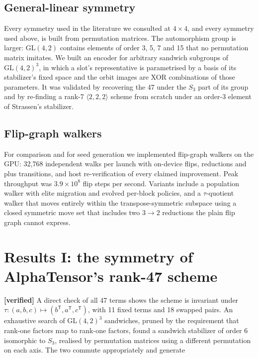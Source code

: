 \documentclass[11pt]{article}
\newcommand{\tw}[3]{\langle #1,#2,#3\rangle}
\newcommand{\GL}{\mathrm{GL}}
\begin{document}
\subsection{General-linear symmetry}

Every symmetry used in the literature we consulted at $4\times4$, and every symmetry used above, is built
from permutation matrices. The automorphism group is larger: $\GL(4,2)$ contains elements of order 3, 5,
7 and 15 that no permutation matrix imitates. We built an encoder for arbitrary sandwich subgroups of
$\GL(4,2)^3$, in which a slot's representative is parametrised by a basis of its stabilizer's fixed space
and the orbit images are XOR combinations of those parameters. It was validated by recovering the 47
under the $S_3$ part of its group and by re-finding a rank-7 $\tw222$ scheme from scratch under an
order-3 element of Strassen's stabilizer.

\subsection{Flip-graph walkers}

For comparison and for seed generation we implemented flip-graph walkers on the GPU: 32{,}768 independent
walks per launch with on-device flips, reductions and plus transitions, and host re-verification of every
claimed improvement. Peak throughput was $3.9\times10^{8}$ flip steps per second. Variants include a
population walker with elite migration and evolved per-block policies, and a $\tau$-quotient walker that
moves entirely within the transpose-symmetric subspace using a closed symmetric move set that includes
two $3\to2$ reductions the plain flip graph cannot express.

\section{Results I: the symmetry of AlphaTensor's rank-47 scheme}
\label{sec:gamma}

\textbf{[verified]} A direct check of all 47 terms shows the scheme is invariant under
$\tau:(a,b,c)\mapsto(b^{\mathsf T},a^{\mathsf T},c^{\mathsf T})$, with 11 fixed terms and 18 swapped
pairs. An exhaustive search of $\GL(4,2)^3$ sandwiches, pruned by the requirement that rank-one factors
map to rank-one factors, found a sandwich stabilizer of order 6 isomorphic to $S_3$, realised by
permutation matrices using a different permutation on each axis. The two commute appropriately and
generate
\end{document}
